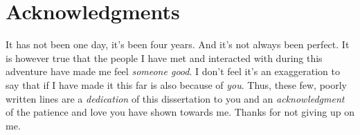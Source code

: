
\chapter*{Acknowledgments}

It has not been one day, it's been four years.
And it's not always been perfect.
It is however true that the people I have met and interacted with during
this adventure have made me feel \emph{someone good}.
I don't feel it's an exaggeration to say that if I have made it this far
is also because of \emph{you}.
Thus, these few, poorly written lines are
a \emph{dedication} of this dissertation to you
and an \emph{acknowledgment}
of the patience and love you have shown towards me.
Thanks for not giving up on me.

